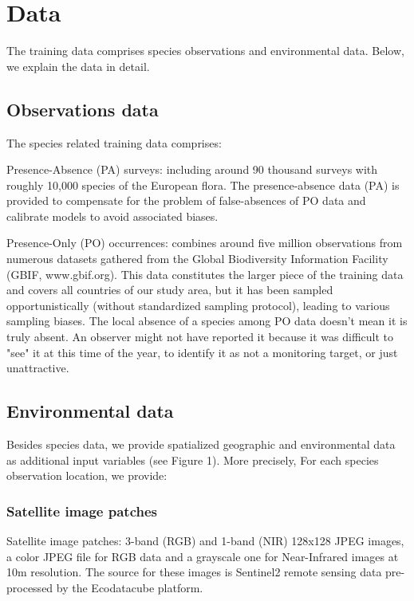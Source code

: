 \section{Data}


The training data comprises species observations and environmental data. Below, we explain the data in detail.

\subsection{Observations data}

The species related training data comprises:

Presence-Absence (PA) surveys: including around 90 thousand surveys with roughly 10,000 species of the European flora. The presence-absence data (PA) is provided to compensate for the problem of false-absences of PO data and calibrate models to avoid associated biases.

Presence-Only (PO) occurrences: combines around five million observations from numerous datasets gathered from the Global Biodiversity Information Facility (GBIF, www.gbif.org). This data constitutes the larger piece of the training data and covers all countries of our study area, but it has been sampled opportunistically (without standardized sampling protocol), leading to various sampling biases. The local absence of a species among PO data doesn't mean it is truly absent. An observer might not have reported it because it was difficult to "see" it at this time of the year, to identify it as not a monitoring target, or just unattractive.

\subsection{Environmental data}

Besides species data, we provide spatialized geographic and environmental data as additional input variables (see Figure 1). More precisely, For each species observation location, we provide:

\subsubsection{Satellite image patches}

Satellite image patches: 3-band (RGB) and 1-band (NIR) 128x128 JPEG images, a color JPEG file for RGB data and a grayscale one for Near-Infrared images at 10m resolution. The source for these images is Sentinel2 remote sensing data pre-processed by the Ecodatacube platform.

